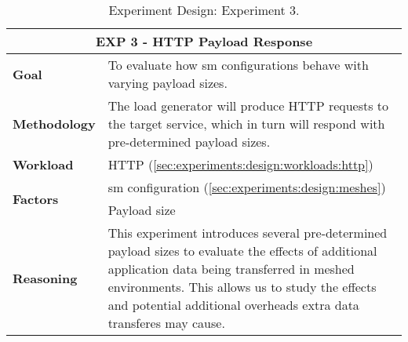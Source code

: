 \begin{table}[!t]
    \centering

    \begin{tabularx}{\textwidth}{l X}
    
        \toprule
        \multicolumn{2}{c}{\textbf{EXP 3 - HTTP Payload Response}}  \\
        \toprule
        
        \textbf{Goal}
        & To evaluate how \gls{sm} configurations behave with varying payload sizes. \\
        \midrule
        
        \textbf{Methodology}
        & The load generator will produce HTTP requests to the target service, which in turn will respond with pre-determined payload sizes.  \\
        \midrule
        
        \textbf{Workload} 
        & HTTP (\cref{sec:experiments:design:workloads:http}) \\
        \midrule

        \multirow{2}{*}{\textbf{Factors}} 
        & \Gls{sm} configuration (\cref{sec:experiments:design:meshes}) \\
        & Payload size \\
        \midrule
        
        \textbf{Reasoning}
        & This experiment introduces several pre-determined payload sizes to evaluate the effects of additional application data being transferred in meshed environments. This allows us to study the effects and potential additional overheads extra data transferes may cause. \\

        \bottomrule

    \end{tabularx}
    \caption[Experiment Design: Experiment 3.]{Experiment Design: Experiment 3.}
    \label{tab:experiment:design:03}
\end{table}